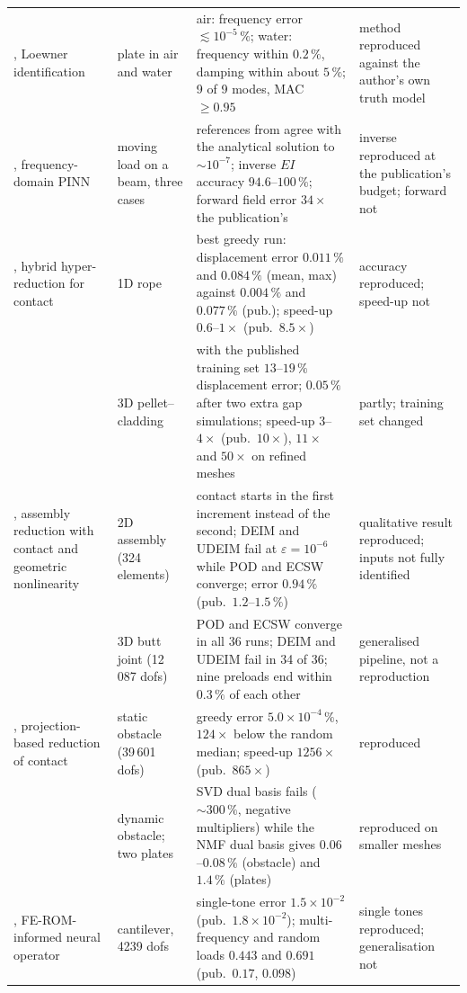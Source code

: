 \begin{table}[tbp]
\begin{tabularx}{\linewidth}{@{}>{\raggedright\arraybackslash}p{2.35cm} >{\raggedright\arraybackslash}p{2.4cm} >{\raggedright\arraybackslash}X >{\raggedright\arraybackslash}p{2.35cm}@{}}
\addlinespace
\citet{liu2026fsi}, Loewner identification & plate in air and water & air: frequency error $\lesssim10^{-5}\,\%$; water: frequency within $0.2\,\%$, damping within about $5\,\%$; 9 of 9 modes, MAC $\ge0.95$ & method reproduced against the author's own truth model \\
\addlinespace
\citet{liang2024fdpinn}, frequency-domain PINN & moving load on a beam, three cases & references from \fea{} agree with the analytical solution to $\sim10^{-7}$; inverse $EI$ accuracy $94.6$--$100\,\%$; forward field error $34\times$ the publication's & inverse reproduced at the publication's budget; forward not \\
\addlinespace
\citet{fauque2018hybrid}, hybrid hyper-reduction for contact & 1D rope & best greedy run: displacement error $0.011\,\%$ and $0.084\,\%$ (mean, max) against $0.004\,\%$ and $0.077\,\%$ (pub.); speed-up $0.6$--$1\times$ (pub.\ $8.5\times$) & accuracy reproduced; speed-up not \\
 & 3D pellet--cladding & with the published training set $13$--$19\,\%$ displacement error; $0.05\,\%$ after two extra gap simulations; speed-up $3$--$4\times$ (pub.\ $10\times$), $11\times$ and $50\times$ on refined meshes & partly; training set changed \\
\addlinespace
\citet{nikiema2026assembly}, assembly reduction with contact and geometric nonlinearity & 2D assembly (324 elements) & contact starts in the first increment instead of the second; DEIM and UDEIM fail at $\varepsilon=10^{-6}$ while POD and ECSW converge; error $0.94\,\%$ (pub.\ $1.2$--$1.5\,\%$) & qualitative result reproduced; inputs not fully identified \\
 & 3D butt joint (12\,087 dofs) & POD and ECSW converge in all 36 runs; DEIM and UDEIM fail in 34 of 36; nine preloads end within $0.3\,\%$ of each other & generalised pipeline, not a reproduction \\
\addlinespace
\citet{balajewicz2016contact}, projection-based reduction of contact & static obstacle (39\,601 dofs) & greedy error $5.0\times10^{-4}\,\%$, $124\times$ below the random median; speed-up $1256\times$ (pub.\ $865\times$) & reproduced \\
 & dynamic obstacle; two plates & SVD dual basis fails ($\sim300\,\%$, negative multipliers) while the NMF dual basis gives $0.06$--$0.08\,\%$ (obstacle) and $1.4\,\%$ (plates) & reproduced on smaller meshes \\
\addlinespace
\citet{yang2025frino}, FE-ROM-informed neural operator & cantilever, 4239 dofs & single-tone error $1.5\times10^{-2}$ (pub.\ $1.8\times10^{-2}$); multi-frequency and random loads $0.443$ and $0.691$ (pub.\ $0.17$, $0.098$) & single tones reproduced; generalisation not \\
\bottomrule
\end{tabularx}
\end{table}


